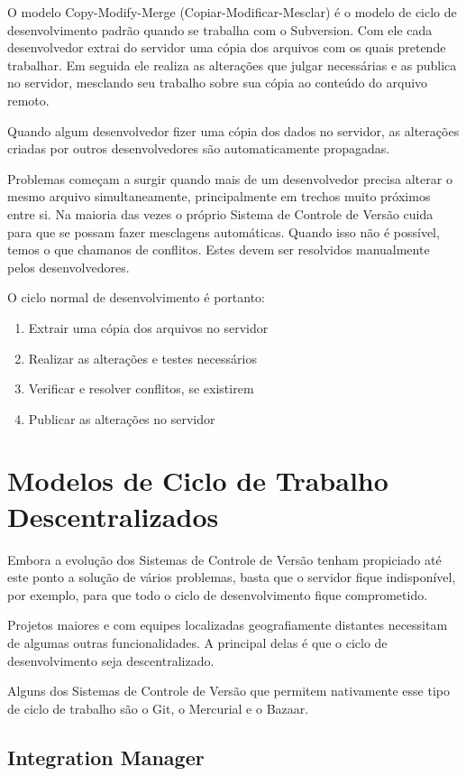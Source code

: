 O modelo Copy-Modify-Merge (Copiar-Modificar-Mesclar) é o modelo de ciclo de desenvolvimento padrão quando se trabalha com o Subversion. Com ele cada desenvolvedor extrai do servidor uma cópia dos arquivos com os quais pretende trabalhar. Em seguida ele realiza as alterações que julgar necessárias e as publica no servidor, mesclando seu trabalho sobre sua cópia ao conteúdo do arquivo remoto.

Quando algum desenvolvedor fizer uma cópia dos dados no servidor, as alterações criadas por outros desenvolvedores são automaticamente propagadas.

Problemas começam a surgir quando mais de um desenvolvedor precisa alterar o mesmo arquivo simultaneamente, principalmente em trechos muito próximos entre si. Na maioria das vezes o próprio Sistema de Controle de Versão cuida para que se possam fazer mesclagens automáticas. Quando isso não é possível, temos o que chamanos de conflitos. Estes devem ser resolvidos manualmente pelos desenvolvedores.

O ciclo normal de desenvolvimento é portanto:

\begin{enumerate}
\item Extrair uma cópia dos arquivos no servidor
\item Realizar as alterações e testes necessários
\item Verificar e resolver conflitos, se existirem
\item Publicar as alterações no servidor
\end{enumerate}

\section{Modelos de Ciclo de Trabalho Descentralizados}

Embora a evolução dos Sistemas de Controle de Versão tenham propiciado até este ponto a solução de vários problemas, basta que o servidor fique indisponível, por exemplo, para que todo o ciclo de desenvolvimento fique comprometido.

Projetos maiores e com equipes localizadas geografiamente distantes necessitam de algumas outras funcionalidades. A principal delas é que o ciclo de desenvolvimento seja descentralizado.

Alguns dos Sistemas de Controle de Versão que permitem nativamente esse tipo de ciclo de trabalho são o Git, o Mercurial e o Bazaar.


\subsection{Integration Manager}

